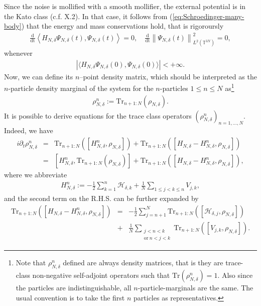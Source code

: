 Since the noise is mollified with a smooth mollifier, the external potential is in the Kato class (c.f.
{\cite{RS80}} X.2). In that case, it follows from
(\ref{eq:Schroedinger-many-body}) that the energy and mass conservations hold,
that is rigoroursly
\begin{align}
  \frac{\mathrm{d}}{\mathrm{dt}} \left\langle H_{N, \delta} \Psi_{N, \delta} (t),
  \Psi_{N, \delta} (t) \right\rangle = 0, \quad \frac{\mathrm{d}}{\mathrm{dt}} \left\| \Psi_{N,
  \delta} (t) \right\|_{L^2 (\mathbb{T}^{3 N})}^2 = 0
  \label{eq:energy-conservation-Liouville},
\end{align}
whenever 
\begin{align*}
    |\langle H_{N, \delta} \Psi_{N, \delta} (0), \Psi_{N, \delta} (0)
\rangle | < + \infty.
\end{align*}
Now, we can define its $n$--point density matrix, which
should be interpreted as the $n$-particle density marginal of the system for
the $n$-particles $1 \leqslant n \leqslant N$ as\footnote{Note
that $\rho_{N, \delta}^n$ defined are always density matrices, that is
they are trace-class non-negative self-adjoint operators such that $\mathrm{Tr}
(\rho^n_{N, \delta}) = 1$. Also since the particles are indistinguishable, all $n$-particle-marginals are the same. The usual convention is to take the first $n$ particles as representatives.}
\begin{align*}
    \rho_{N,
\delta}^n :=  \mathrm{Tr}_{n + 1 : N} (\rho_{N, \delta}).
\end{align*}
It is possible to derive equations for the trace class operators $(\rho^n_{N,
\delta})_{n = 1, \ldots, N}$. Indeed, we have
\begin{eqnarray*}
  i \partial_t \rho_{N, \delta}^n & = & \mathrm{Tr}_{n + 1 : N} \left([H^n_{N,
  \delta}, \rho_{N, \delta}]\right) + \mathrm{Tr}_{n + 1 : N} \left([H_{N, \delta} -
  H^n_{N, \delta}, \rho_{N, \delta}]\right)\\
  & = & [H^n_{N, \delta}, \mathrm{Tr}_{n + 1 : N} (\rho_{N, \delta})] +
  \mathrm{Tr}_{n + 1 : N} \left([H_{N, \delta} - H^n_{N, \delta}, \rho_{N, \delta}]\right),
\end{eqnarray*}
where we abbreviate 
\begin{align*}
   H^n_{N, \delta} := - \frac{1}{2} \sum^n_{k = 1}
\mathcal{H}_{\delta, k} + \frac{1}{N} \sum_{1 \leqslant j < k \leqslant n}
V_{j, k}, 
\end{align*}
and the second term on the R.H.S. can be further expanded by
\begin{eqnarray}
  \mathrm{Tr}_{n + 1 : N} \left([H_{N, \delta} - H^n_{N, \delta}, \rho_{N, \delta}]\right)
  & = & - \frac{1}{2} \sum_{j = n + 1}^N \mathrm{Tr}_{n + 1 : N}
  \left([\mathcal{H}_{\delta, j}, \rho_{N, \delta}]\right) \nonumber\\
  & + & \frac{1}{N} \sum_{\substack{j < n < k \\ \text{or} \ n < j < k}} \mathrm{Tr}_{n + 1 : N}
  \left([V_{j, k}, \rho_{N, \delta}]\right) .  \label{eq:par-tra:residual}
\end{eqnarray}
